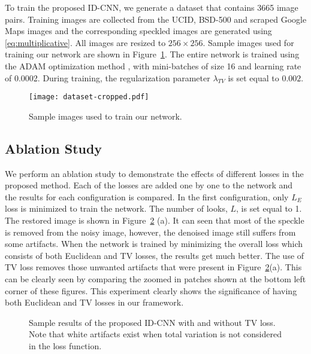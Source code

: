 \documentclass[journal]{IEEEtran}
\begin{document}
To train the proposed ID-CNN,  we generate a dataset that contains  3665 image pairs. Training images are collected from the UCID, BSD-500 and scraped Google Maps images \cite{pix2pix} and the corresponding speckled images are generated using \eqref{eq:multiplicative}.  All images are resized to $256 \times 256$. Sample images used for training our network are shown in Figure~\ref{fig:dataset}. The entire network is trained  using the ADAM optimization method  \cite{adam_opt}, with mini-batches of size 16 and learning rate of 0.0002. During training, the regularization parameter $\lambda_{TV}$ is set equal to $0.002$.  

\begin{figure}[htp!]
 \centering
 \texttt{[image: dataset-cropped.pdf]}
 \caption{Sample images used to train our network.}
\label{fig:dataset}
\end{figure}


\subsection{Ablation Study} 
We perform an ablation study to demonstrate the effects of different losses in the proposed method. Each of the losses are added one by one to the network and the results for each configuration is compared.  In the first configuration, only $L_E$ loss is minimized to train the network.  The number of looks, $L$, is set equal to 1.  The restored image is shown in Figure~\ref{fig:TV} (a).  It can seen that most of the speckle is removed from the noisy image, however, the denoised image still suffers from some artifacts.  When the network is trained by minimizing the overall loss which consists of both Euclidean and TV losses, the results get much better.  The use of TV loss removes those unwanted artifacts that were present in Figure~\ref{fig:TV}(a).   This can be clearly seen by comparing the zoomed in patches shown at the bottom left corner of these figures.  This experiment clearly shows the significance of having both Euclidean and TV losses in our framework. 

\begin{figure}[htp!]
	\centering
	\label{1a}\hspace{1em}
	\label{1b}
	\caption{Sample results of the proposed ID-CNN with and without TV loss. Note that white artifacts exist when total variation is not considered in the loss function.}
	\label{fig:TV} 
\end{figure}
\end{document}

